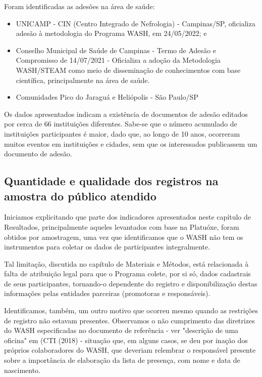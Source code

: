 Foram identificadas as adesões na área de saúde:


\begin{itemize}
\item UNICAMP - CIN (Centro Integrado de Nefrologia) - Campinas/SP, oficializa adesão à metodologia do Programa WASH, em 24/05/2022; e
\item Conselho Municipal de  Saúde de Campinas - Termo de Adesão e Compromisso de 14/07/2021 - Oficializa a adoção da Metodologia WASH/STEAM como meio de disseminação de conhecimentos com base científica, principalmente na área de saúde.
\item Comunidades Pico do Jaraguá e Heliópolis - São Paulo/SP
\end{itemize}

Os dados apresentados indicam a existência de documentos de adesão editados por cerca de 66 instituições diferentes. Sabe-se que o número acumulado de instituições participantes é maior, dado que, ao longo de 10 anos, ocorreram muitos eventos em instituições e cidades, sem que os interessados publicassem um documento de adesão.

\subsection[Quantidade e qualidade dos registros na amostra do público atendido]{Quantidade e qualidade dos registros na amostra do público atendido}\label{Quantidade e qualidade dos registros na amostra do público atendido}
Iniciamos explicitando que parte dos indicadores apresentados neste capítulo de Resultados, principalmente aqueles levantados com base na Platuóxe, foram obtidos por amostragem, uma vez que identificamos que o WASH não tem os instrumentos para coletar os dados de participantes integralmente.

Tal limitação, discutida no capítulo de Materiais e Métodos, está relacionada à falta de atribuição legal para que o Programa colete, por si só, dados cadastrais de seus participantes, tornando-o dependente do registro e disponibilização destas informações pelas entidades parceiras (promotoras e responsáveis).

Identificamos, também, um outro motivo que ocorreu mesmo quando as restrições de registro não estavam presentes. Observamos o não cumprimento das diretrizes do WASH especificadas no documento de referência - ver "descrição de uma oficina" em (CTI (2018) - situação que, em alguns casos, se deu por inação dos próprios colaboradores do WASH, que deveriam relembrar o responsável presente sobre a importância de elaboração da lista de presença, com nome e data de nascimento.

